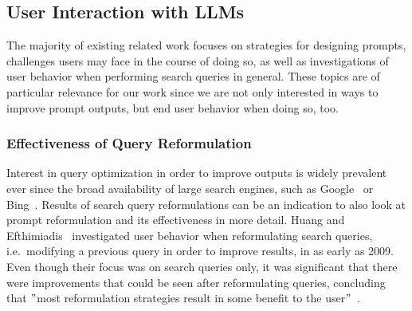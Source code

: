 
\subsection{User Interaction with LLMs}
\label{subsec:user-interaction-with-llms}
The majority of existing related work focuses on strategies for designing prompts,
challenges users may face in the course of doing so, as well as investigations of user behavior when
performing search queries in general.
These topics are of particular relevance for our work since we are not only interested in ways to
improve prompt outputs, but end user behavior when doing so, too.

\subsubsection{Effectiveness of Query Reformulation}
Interest in query optimization in order to improve outputs is widely prevalent ever since the broad
availability of large search engines, such as Google~\cite{google_google_2023} or Bing~\cite{microsoft_bing_2023}.
Results of search query reformulations can be an indication to also look at prompt reformulation
and its effectiveness in more detail.
Huang and Efthimiadis~\cite{huang_analyzing_2009} investigated user behavior when reformulating search
queries, i.e.\ modifying a previous query in order to improve results, in as early as 2009.
Even though their focus was on search queries only, it was significant that there were improvements
that could be seen after reformulating queries, concluding that
\("\)most reformulation strategies result in some benefit to the user\("\)~\cite[p. 1]{huang_analyzing_2009}.


